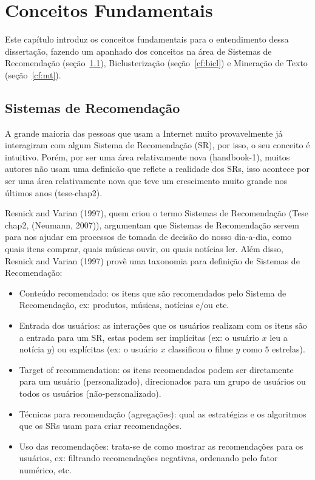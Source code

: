 \documentclass[normaltoc, espacoumemeio, pnumromarab,ruledheader]{abnt}
\begin{document}
\chapter{Conceitos Fundamentais}

Este capítulo introduz os conceitos fundamentais para o entendimento dessa dissertação, fazendo um apanhado dos conceitos na área de Sistemas de Recomendação (seção~\ref{cf:sr}), Biclusterização (seção~\ref{cf:bicl}) e Mineração de Texto (seção~\ref{cf:mt}).

\section{Sistemas de Recomendação}
\label{cf:sr}

A grande maioria das pessoas que usam a Internet muito provavelmente já interagiram com algum Sistema de Recomendação (SR), por isso, o seu conceito é intuitivo. Porém, por ser uma área relativamente nova (handbook-1), muitos autores não usam uma definicão que reflete a realidade dos SRs, isso acontece por ser uma área relativamente nova que teve um crescimento muito grande nos últimos anos (tese-chap2).

Resnick and Varian (1997), quem criou o termo Sistemas de Recomendação (Tese chap2, (Neumann, 2007)), argumentam que Sistemas de Recomendação servem para nos ajudar em processos de tomada de decisão do nosso dia-a-dia, como quais itens comprar, quais músicas ouvir, ou quais notícias ler. Além disso, Resnick and Varian (1997) provê uma taxonomia para definição de Sistemas de Recomendação:
\begin{itemize}
  \item Conteúdo recomendado: os itens que são recomendados pelo Sistema de Recomendação, ex: produtos, músicas, notícias e/ou etc.
  \item Entrada dos usuários: as interações que os usuários realizam com os itens são a entrada para um SR, estas podem ser implícitas (ex: o usuário $x$ leu a notícia $y$) ou explícitas (ex: o usuário $x$ classificou o filme $y$ como $5$ estrelas).
  \item Target of recommendation: os itens recomendados podem ser diretamente para um usuário (personalizado), direcionados para um grupo de usuários ou todos os usuários (não-personalizado).
  \item Técnicas para recomendação (agregações): qual as estratégias e os algoritmos que os SRs usam para criar recomendações.
  \item Uso das recomendações: trata-se de como mostrar as recomendações para os usuários, ex: filtrando recomendações negativas, ordenando pelo fator numérico, etc.
\end{itemize}
\end{document}
